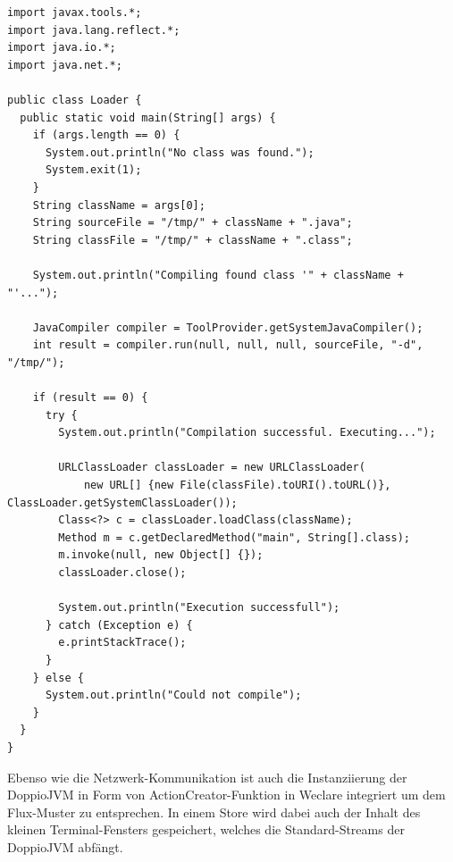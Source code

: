 \begin{minipage}{\linewidth}
\begin{lstlisting}[caption={Java-Loader, der programmatisch Quelltext kompiliert und ausführt. (aus: public/doppio/Loader.java)}]
import javax.tools.*;
import java.lang.reflect.*;
import java.io.*;
import java.net.*;

public class Loader {
  public static void main(String[] args) {
    if (args.length == 0) {
      System.out.println("No class was found.");
      System.exit(1);
    }
    String className = args[0];
    String sourceFile = "/tmp/" + className + ".java";
    String classFile = "/tmp/" + className + ".class";

    System.out.println("Compiling found class '" + className + "'...");

    JavaCompiler compiler = ToolProvider.getSystemJavaCompiler();
    int result = compiler.run(null, null, null, sourceFile, "-d", "/tmp/");

    if (result == 0) {
      try {
        System.out.println("Compilation successful. Executing...");

        URLClassLoader classLoader = new URLClassLoader(
            new URL[] {new File(classFile).toURI().toURL()}, ClassLoader.getSystemClassLoader());
        Class<?> c = classLoader.loadClass(className);
        Method m = c.getDeclaredMethod("main", String[].class);
        m.invoke(null, new Object[] {});
        classLoader.close();

        System.out.println("Execution successfull");
      } catch (Exception e) {
        e.printStackTrace();
      }
    } else {
      System.out.println("Could not compile");
    }
  }
}
\end{lstlisting}
\end{minipage}

Ebenso wie die Netzwerk-Kommunikation ist auch die Instanziierung der DoppioJVM in Form von ActionCreator-Funktion in Weclare integriert um dem Flux-Muster zu entsprechen. In einem Store wird dabei auch der Inhalt des kleinen Terminal-Fensters gespeichert, welches die Standard-Streams der DoppioJVM abfängt.

